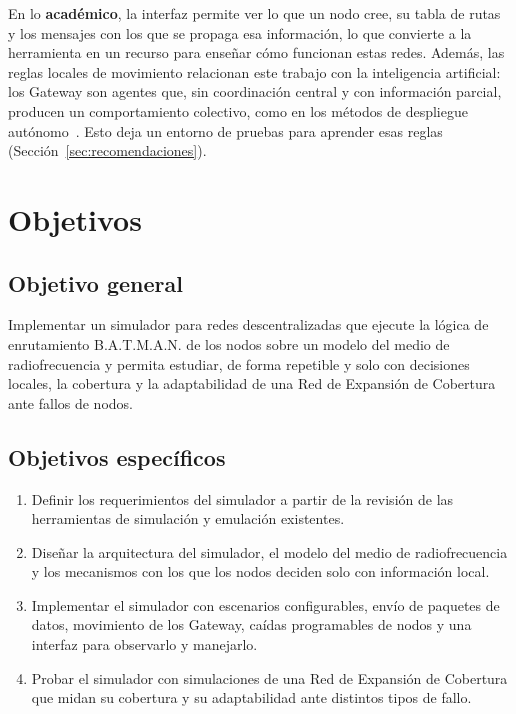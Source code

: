 En lo \textbf{académico}, la interfaz permite ver lo que un nodo cree, su tabla
de rutas y los mensajes con los que se propaga esa información, lo que convierte
a la herramienta en un recurso para enseñar cómo funcionan estas redes. Además,
las reglas locales de movimiento relacionan este trabajo con la inteligencia
artificial: los Gateway son agentes que, sin coordinación central y con
información parcial, producen un comportamiento colectivo, como en los métodos de
despliegue autónomo~\cite{Howard2002PotentialFields,Poduri2004ConstrainedCoverage}.
Esto deja un entorno de pruebas para aprender esas reglas
(Sección~\ref{sec:recomendaciones}).

\section{Objetivos}
\label{sec:objetivos}

\subsection{Objetivo general}

Implementar un simulador para redes descentralizadas que ejecute la lógica de
enrutamiento B.A.T.M.A.N. de los nodos sobre un modelo del medio de
radiofrecuencia y permita estudiar, de forma repetible y solo con decisiones
locales, la cobertura y la adaptabilidad de una Red de Expansión de Cobertura
ante fallos de nodos.

\subsection{Objetivos específicos}
\label{subsec:objetivos-especificos}

\begin{enumerate}
\item Definir los requerimientos del simulador a partir de la revisión de las
herramientas de simulación y emulación existentes.
\item Diseñar la arquitectura del simulador, el modelo del medio de
radiofrecuencia y los mecanismos con los que los nodos deciden solo con
información local.
\item Implementar el simulador con escenarios configurables, envío de paquetes
de datos, movimiento de los Gateway, caídas programables de nodos y una interfaz
para observarlo y manejarlo.
\item Probar el simulador con simulaciones de una Red de Expansión de Cobertura
que midan su cobertura y su adaptabilidad ante distintos tipos de fallo.
\end{enumerate}

